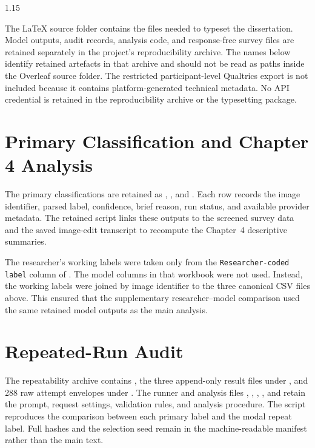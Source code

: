 \begin{spacing}{1.15}

The LaTeX source folder contains the files needed to typeset the dissertation.
Model outputs, audit records, analysis code, and response-free survey files are
retained separately in the project's reproducibility archive. The names below
identify retained artefacts in that archive and should not be read as paths
inside the Overleaf source folder. The restricted participant-level Qualtrics
export is not included because it contains platform-generated technical
metadata. No API credential is retained in the reproducibility archive or the
typesetting package.

\section{Primary Classification and Chapter 4 Analysis}

The primary classifications are retained as
, , and
. Each row records the image identifier,
parsed label, confidence, brief reason, run status, and available provider
metadata. The retained  script links these
outputs to the screened survey data and the saved image-edit transcript to
recompute the Chapter~4 descriptive summaries.

The researcher's working labels were taken only from the
\texttt{Researcher-coded label} column of
. The model columns in that workbook
were not used. Instead, the working labels were joined by image identifier to
the three canonical CSV files above. This ensured that the supplementary
researcher--model comparison used the same retained model outputs as the main
analysis.

\section{Repeated-Run Audit}

The repeatability archive contains , the
three append-only result files under , and 288 raw
attempt envelopes under . The runner and
analysis files ,
, ,
, and  retain
the prompt, request settings, validation rules, and analysis procedure. The
script  reproduces the comparison
between each primary label and the modal repeat label. Full hashes and the
selection seed remain in the machine-readable manifest rather than the main
text.


\end{spacing}
